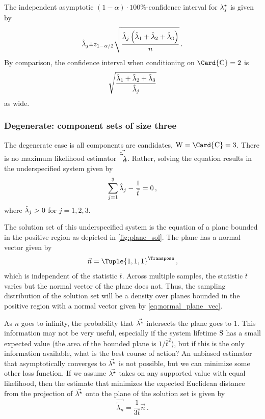 \documentclass[../main.tex]{subfiles}
\begin{document}
The independent asymptotic $(1-\alpha) \cdot 100 \%$-confidence interval for ${\lambda}^{\star}_j$ is given by
\begin{equation}
    \estimator{\lambda}_j \raisebox{.2ex}{$\scriptstyle\pm$} z_{1 - \alpha/2}
    \sqrt{
        \frac
        {
            \estimator{\lambda}_j \left(\estimator{\lambda}_1 + \estimator{\lambda}_2 + \estimator{\lambda}_3\right)
        }
        {n}
    }\,.
\end{equation}
By comparison, the confidence interval when conditioning on $\Card{\rvcand} = 2$ is
\begin{equation}
    \sqrt{
        \frac
        {
            \hat{\lambda}_1 + \hat{\lambda}_2 + \hat{\lambda}_3
        }
        {
            \hat{\lambda}_j
        }
    }
\end{equation}
as wide.

\subsubsection{Degenerate: component sets of size three}
The degenerate case is all components are candidates, $\RV{W} = \Card{\rvcand} = 3$. There is no maximum likelihood estimator $\vec{\hat{\vec\lambda}_n}$. Rather, solving the equation results in the underspecified system given by
\begin{equation}
    \sum_{j=1}^{3} \hat{\lambda}_j - \frac{1}{\bar{t}} = 0\,,
\end{equation}
where $\hat{\lambda}_j > 0$ for $j=1,2,3$.

The solution set of this underspecified system is the equation of a plane bounded in the positive region as depicted in \cref{fig:plane_sol}. The plane has a normal vector given by
\begin{equation}
\label{eq:normal_plane_vec}
    \vec{n} = \Tuple{1,1,1}^\Transpose\,,
\end{equation}
which is independent of the statistic $\bar{t}$. Across multiple samples, the statistic $\bar{t}$ varies but the normal vector of the plane does not. Thus, the sampling distribution of the solution set will be a density over planes bounded in the positive region with a normal vector given by \cref{eq:normal_plane_vec}.

As $n$ goes to infinity, the probability that $\vec{{\lambda}^{\star}}$ intersects the plane goes to $1$. This information may not be very useful, especially if the system lifetime $\mathrm{S}$ has a small expected value (the area of the bounded plane is $1/\bar{t}^2$), but if this is the only information available, what is the best course of action? An unbiased estimator that asymptotically converges to $\vec{{\lambda}^{\star}}$ is not possible, but we can minimize some other loss function. If we assume $\vec{{\lambda}^{\star}}$ takes on any supported value with equal likelihood, then the estimate that minimizes the expected Euclidean distance from the projection of $\vec{{\lambda}^{\star}}$ onto the plane of the solution set is given by
\begin{equation}
    \vec{\tilde\lambda_n} = \frac{1}{3 \bar{t}} \vec{n}\,.
\end{equation}
\end{document}
